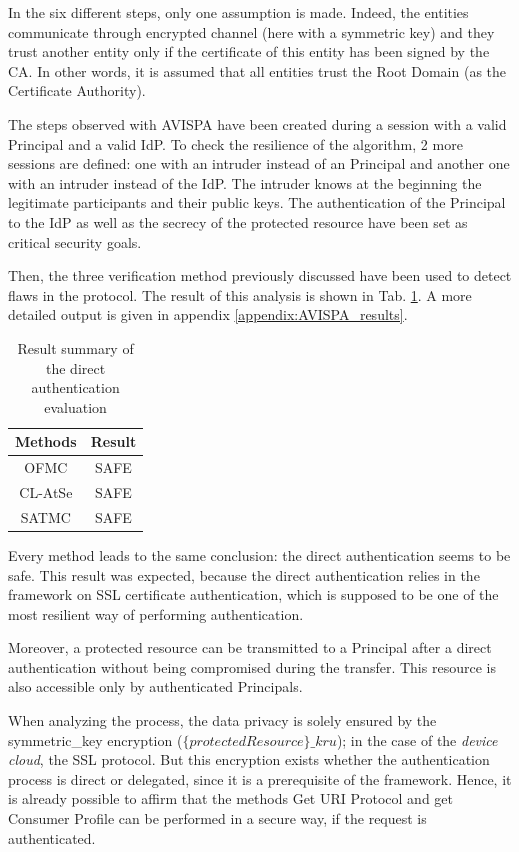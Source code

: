 In the six different steps, only one assumption is made. Indeed, the entities communicate through encrypted channel (here with a symmetric key) and they trust another entity only if the certificate of this entity has been signed by the CA. In other words, it is assumed that all entities trust the Root Domain (as the Certificate Authority).

The steps observed with AVISPA have been created during a session with a valid Principal and a valid IdP. To check the resilience of the algorithm, 2 more sessions are defined: one with an intruder instead of an Principal and another one with an intruder instead of the IdP. The intruder knows at the beginning the legitimate participants and their public keys. The authentication of the Principal to the IdP as well as the secrecy of the protected resource have been set as critical security goals.

Then, the three verification method previously discussed have been used to detect flaws in the protocol. The result of this analysis is shown in Tab. \ref{tab:result_1}. A more detailed output is given in appendix \ref{appendix:AVISPA_results}.

\begin{table}[!hpbt]
	\centering
	\caption{Result summary of the direct authentication evaluation}
	\label{tab:result_1}
	\begin{tabular}{|c|c|}
		\hline Methods &  Result\\ 
		\hline OFMC & SAFE \\ 
		\hline CL-AtSe & SAFE \\ 
		\hline SATMC & SAFE \\ 
		\hline 
	\end{tabular} 
\end{table}

Every method leads to the same conclusion: the direct authentication seems to be safe. This result was expected, because the direct authentication relies in the framework on SSL certificate authentication, which is supposed to be one of the most resilient way of performing authentication. 

Moreover, a protected resource can be transmitted to a Principal after a direct authentication without being compromised during the transfer. This resource is also accessible only by authenticated Principals.

When analyzing the process, the data privacy is solely ensured by the symmetric\_key encryption ($ \{protectedResource\}\_kru $); in the case of the \emph{device cloud}, the SSL protocol. But this encryption exists whether the authentication process is direct or delegated, since it is a prerequisite of the framework. Hence, it is already possible to affirm that the methods Get URI Protocol and get Consumer Profile can be performed in a secure way, if the request is authenticated.

